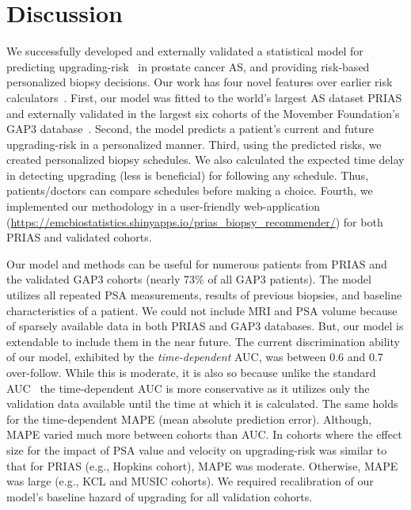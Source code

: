 \section{Discussion}
We successfully developed and externally validated a statistical model for predicting upgrading-risk~\citep{bruinsma2017expert} in prostate cancer AS, and providing risk-based personalized biopsy decisions. Our work has four novel features over earlier risk calculators~\citep{coley2017prediction,ankerst2015precision}. First, our model was fitted to the world's largest AS dataset PRIAS and externally validated in the largest six cohorts of the Movember Foundation's GAP3 database~\citep{gap3_2018}. Second, the model predicts a patient's current and future upgrading-risk in a personalized manner. Third, using the predicted risks, we created personalized biopsy schedules. We also calculated the expected time delay in detecting upgrading (less is beneficial) for following any schedule. Thus, patients/doctors can compare schedules before making a choice. Fourth, we implemented our methodology in a user-friendly web-application (\url{https://emcbiostatistics.shinyapps.io/prias_biopsy_recommender/}) for both PRIAS and validated cohorts.

Our model and methods can be useful for numerous patients from PRIAS and the validated GAP3 cohorts (nearly 73\% of all GAP3 patients). The model utilizes all repeated PSA measurements, results of previous biopsies, and baseline characteristics of a patient. We could not include MRI and PSA volume because of sparsely available data in both PRIAS and GAP3 databases. But, our model is extendable to include them in the near future. The current discrimination ability of our model, exhibited by the \textit{time-dependent} AUC, was between 0.6 and 0.7 over-follow. While this is moderate, it is also so because unlike the standard AUC~\citep{steyerberg2010assessing} the time-dependent AUC is more conservative as it utilizes only the validation data available until the time at which it is calculated. The same holds for the time-dependent MAPE (mean absolute prediction error). Although, MAPE varied much more between cohorts than AUC. In cohorts where the effect size for the impact of PSA value and velocity on upgrading-risk was similar to that for PRIAS (e.g., Hopkins cohort), MAPE was moderate. Otherwise, MAPE was large (e.g., KCL and MUSIC cohorts). We required recalibration of our model's baseline hazard of upgrading for all validation cohorts.

